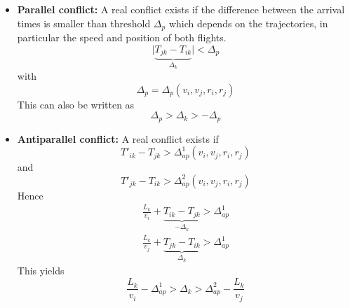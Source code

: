\documentclass{article}
\begin{document}
\begin{itemize}
    \item {\bf Parallel conflict:}
        A real conflict exists if the difference between the arrival times is smaller than threshold $\Delta_p$ which depends on the trajectories, in particular the speed and position of both flights.
        \begin{equation*}
            \bigl| \underbrace{T_{jk} - T_{ik}}_{\Delta_k} \bigr| < \Delta_p
        \end{equation*}
        with
        \begin{equation*}
            \Delta_p = \Delta_p(v_i, v_j, r_i, r_j)
        \end{equation*}
        This can also be written as
        \begin{equation}  \label{eqn:spatial_conflict_parallel}
            \Delta_p > \Delta_k > -\Delta_p 
        \end{equation}
        
    \item {\bf Antiparallel conflict:}
        A real conflict exists if 
        \begin{equation*}
            T'_{ik} - T_{jk} > \Delta^1_{ap}(v_i, v_j, r_i, r_j)
        \end{equation*}
        and
        \begin{equation*}
            T'_{jk} - T_{ik} > \Delta^2_{ap}(v_i, v_j, r_i, r_j)
        \end{equation*}
        Hence
        \begin{eqnarray*}
            \frac{L_k}{v_i} + \underbrace{T_{ik} - T_{jk}}_{-\Delta_k} > \Delta^1_{ap} \\
            \frac{L_k}{v_j} + \underbrace{T_{jk} - T_{ik}}_{\Delta_k} > \Delta^1_{ap} 
        \end{eqnarray*}
        This yields
        \begin{equation} \label{eqn:spatial_conflict_antiparallel}
            \frac{L_k}{v_i} - \Delta^1_{ap} > \Delta_k > \Delta^2_{ap} - \frac{L_k}{v_j}
        \end{equation}
\end{itemize}
\end{document}
